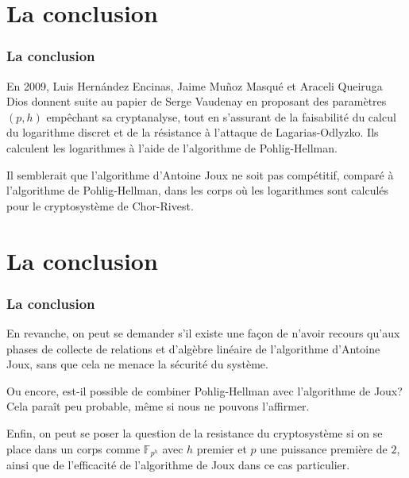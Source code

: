 \documentclass{beamer}
\theoremstyle{definition}
\theoremstyle{remark}
\def\gf #1{\mathbb{F}_{#1}}
\begin{document}
\section*{La conclusion}
\begin{frame}
  \frametitle{La conclusion}
  En 2009, Luis Hern\'andez Encinas, Jaime Mu\~noz Masqué et Araceli Queiruga Dios donnent suite au papier de Serge Vaudenay en proposant des paramètres $(p,h)$ empêchant sa cryptanalyse, tout en s'assurant de la faisabilité du calcul du logarithme discret et de la résistance à l'attaque de Lagarias-Odlyzko. Ils calculent les logarithmes à l'aide de l'algorithme de Pohlig-Hellman.

  Il semblerait que l'algorithme d'Antoine Joux ne soit pas compétitif, comparé à l'algorithme de Pohlig-Hellman, dans les corps où les logarithmes sont calculés pour le cryptosystème de Chor-Rivest.
\end{frame}

\section*{La conclusion}
\begin{frame}
  \frametitle{La conclusion}
  En revanche, on peut se demander s'il existe une façon de n'avoir recours qu'aux phases de collecte de relations et d'algèbre linéaire de l'algorithme d'Antoine Joux, sans que cela ne menace la sécurité du système.

  Ou encore, est-il possible de combiner Pohlig-Hellman avec l'algorithme de Joux? Cela paraît peu probable, même si nous ne pouvons l'affirmer.
  
  Enfin, on peut se poser la question de la resistance du cryptosystème si on se place dans un corps comme $\gf{p^h}$ avec $h$ premier et $p$ une puissance première de $2$, ainsi que
de l'efficacité de l'algorithme de Joux dans ce cas particulier.
\end{frame}
\end{document}
